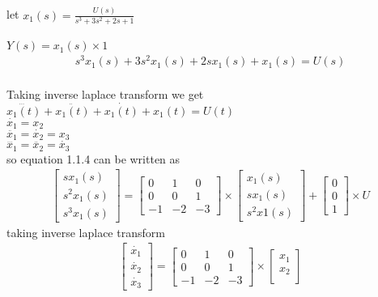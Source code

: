 \begin{enumerate}[label=\thesection.\arabic*.,ref=\thesection.\theenumi]
\\
\\let   $x_{1}(s)=\frac{U(s)}{s^3+3s^2+2s+1}$
\\
\\$Y(s)=x_{1}(s)\times 1 $
\begin{align}
s^3x_{1}(s)+3s^2x_{1}(s)+2sx_{1}(s)+x_{1}(s)=U(s)
\end{align}
\\ Taking inverse laplace transform we get
\\$\dddot{x_{1}(t)}+\ddot{x_{1}(t)}+\dot{x_{1}(t)}+x_{1}(t)=U(t)$
\\$\dot{x_{1}}=x_{2}$
\\$\ddot{x_{1}}=\dot{x_{2}}=x_{3}$
\\$\dddot{x_{1}}=\ddot{x_{2}}=\dot{x_{3}}$
\\ so equation 1.1.4 can be written as
\\
\begin{gather}
\begin{bmatrix}
sx_{1}(s)\\
s^2x_{1}(s)\\
s^3x_{1}(s)
\end{bmatrix}
=
\begin{bmatrix}
0&1&0\\
0&0&1\\
-1&-2&-3
\end{bmatrix}\times \begin{bmatrix}
x_{1}(s)\\
sx_{1}(s)\\
s^2x{1}(s)
\end{bmatrix}
+
\begin{bmatrix}
0\\
0\\
1
\end{bmatrix} \times U
\end{gather}
taking inverse laplace transform
\begin{gather}
\begin{bmatrix}
\dot{x_{1}}\\
\dot{x_{2}}\\
\dot{x_{3}}
\end{bmatrix}
=
\begin{bmatrix}
0&1&0\\
0&0&1\\
-1&-2&-3
\end{bmatrix}\times \begin{bmatrix}
x_{1}\\
x_{2}\\

\end{bmatrix}
\end{gather}
\end{enumerate}
